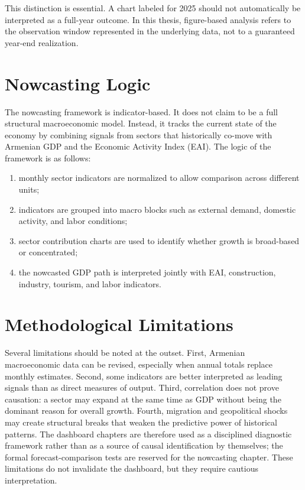 \documentclass[12pt,a4paper]{report}
\begin{document}
This distinction is essential. A chart labeled for 2025 should not automatically be interpreted as a full-year outcome. In this thesis, figure-based analysis refers to the observation window represented in the underlying data, not to a guaranteed year-end realization.

\section{Nowcasting Logic}
The nowcasting framework is indicator-based. It does not claim to be a full structural macroeconomic model. Instead, it tracks the current state of the economy by combining signals from sectors that historically co-move with Armenian GDP and the Economic Activity Index (EAI). The logic of the framework is as follows:
\begin{enumerate}
    \item monthly sector indicators are normalized to allow comparison across different units;
    \item indicators are grouped into macro blocks such as external demand, domestic activity, and labor conditions;
    \item sector contribution charts are used to identify whether growth is broad-based or concentrated;
    \item the nowcasted GDP path is interpreted jointly with EAI, construction, industry, tourism, and labor indicators.
\end{enumerate}

\section{Methodological Limitations}
Several limitations should be noted at the outset. First, Armenian macroeconomic data can be revised, especially when annual totals replace monthly estimates. Second, some indicators are better interpreted as leading signals than as direct measures of output. Third, correlation does not prove causation: a sector may expand at the same time as GDP without being the dominant reason for overall growth. Fourth, migration and geopolitical shocks may create structural breaks that weaken the predictive power of historical patterns. The dashboard chapters are therefore used as a disciplined diagnostic framework rather than as a source of causal identification by themselves; the formal forecast-comparison tests are reserved for the nowcasting chapter. These limitations do not invalidate the dashboard, but they require cautious interpretation.\cite{imfCR24348,wbPulse2025}
\end{document}
